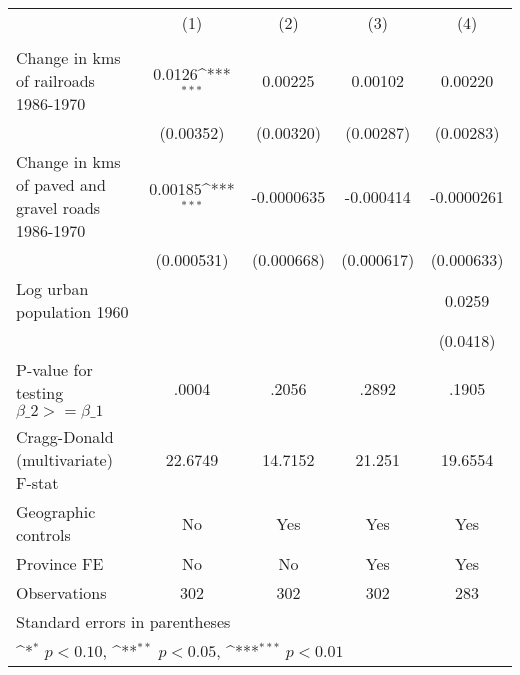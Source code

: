 {
\def\sym#1{\ifmmode^{#1}\else\(^{#1}\)\fi}
\begin{tabular}{l*{4}{c}}
\hline\hline
                &\multicolumn{1}{c}{(1)}&\multicolumn{1}{c}{(2)}&\multicolumn{1}{c}{(3)}&\multicolumn{1}{c}{(4)}\\
                &\multicolumn{1}{c}{}&\multicolumn{1}{c}{}&\multicolumn{1}{c}{}&\multicolumn{1}{c}{}\\
\hline
Change in kms of railroads 1986-1970&   0.0126\sym{***}&  0.00225         &  0.00102         &  0.00220         \\
                &(0.00352)         &(0.00320)         &(0.00287)         &(0.00283)         \\
[1em]
Change in kms of paved and gravel roads 1986-1970&  0.00185\sym{***}&-0.0000635         &-0.000414         &-0.0000261         \\
                &(0.000531)         &(0.000668)         &(0.000617)         &(0.000633)         \\
[1em]
Log urban population 1960&                  &                  &                  &   0.0259         \\
                &                  &                  &                  & (0.0418)         \\
\hline
P-value for testing $\beta\_{2} >= \beta\_{1}$&    .0004         &    .2056         &    .2892         &    .1905         \\
Cragg-Donald (multivariate) F-stat&  22.6749         &  14.7152         &   21.251         &  19.6554         \\
Geographic controls&       No         &      Yes         &      Yes         &      Yes         \\
Province FE     &       No         &       No         &      Yes         &      Yes         \\
Observations    &      302         &      302         &      302         &      283         \\
\hline\hline
\multicolumn{5}{l}{\footnotesize Standard errors in parentheses}\\
\multicolumn{5}{l}{\footnotesize \sym{*} \(p<0.10\), \sym{**} \(p<0.05\), \sym{***} \(p<0.01\)}\\
\end{tabular}
}
